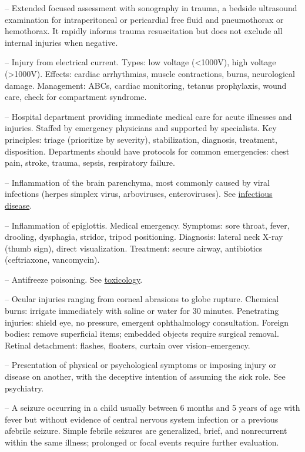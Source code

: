 -- Extended focused assessment with sonography in trauma, a bedside ultrasound examination for intraperitoneal or pericardial free fluid and pneumothorax or hemothorax. It rapidly informs trauma resuscitation but does not exclude all internal injuries when negative.

-- Injury from electrical current. Types: low voltage (<1000V), high voltage (>1000V). Effects: cardiac arrhythmias, muscle contractions, burns, neurological damage. Management: ABCs, cardiac monitoring, tetanus prophylaxis, wound care, check for compartment syndrome.

-- Hospital department providing immediate medical care for acute illnesses and injuries. Staffed by emergency physicians and supported by specialists. Key principles: triage (prioritize by severity), stabilization, diagnosis, treatment, disposition. Departments should have protocols for common emergencies: chest pain, stroke, trauma, sepsis, respiratory failure.

-- Inflammation of the brain parenchyma, most commonly caused by viral infections (herpes simplex virus, arboviruses, enteroviruses). See \hyperlink{Infectious Disease}{infectious disease}.

-- Inflammation of epiglottis. Medical emergency. Symptoms: sore throat, fever, drooling, dysphagia, stridor, tripod positioning. Diagnosis: lateral neck X-ray (thumb sign), direct visualization. Treatment: secure airway, antibiotics (ceftriaxone, vancomycin).

-- Antifreeze poisoning. See \hyperlink{Toxicology}{toxicology}.

-- Ocular injuries ranging from corneal abrasions to globe rupture. Chemical burns: irrigate immediately with saline or water for 30 minutes. Penetrating injuries: shield eye, no pressure, emergent ophthalmology consultation. Foreign bodies: remove superficial items; embedded objects require surgical removal. Retinal detachment: flashes, floaters, curtain over vision--emergency.

-- Presentation of physical or psychological symptoms or imposing injury or disease on another, with the deceptive intention of assuming the sick role. See psychiatry.

-- A seizure occurring in a child usually between 6 months and 5 years of age with fever but without evidence of central nervous system infection or a previous afebrile seizure. Simple febrile seizures are generalized, brief, and nonrecurrent within the same illness; prolonged or focal events require further evaluation.

